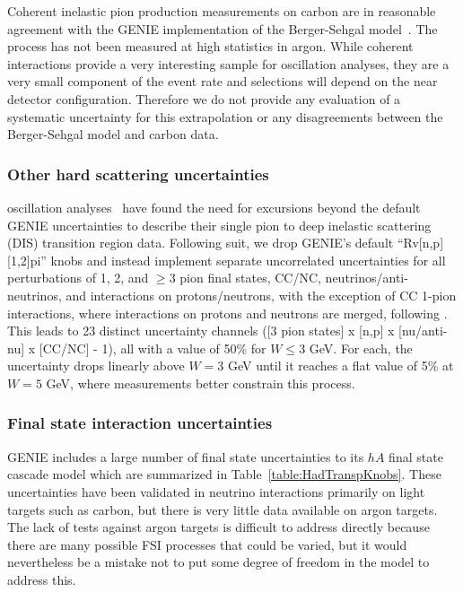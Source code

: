 Coherent inelastic pion production measurements on carbon are in reasonable agreement with the GENIE implementation of the Berger-Sehgal model~\cite{Mislivec:2017qfz}.  The process has not been measured at high statistics in argon. While coherent interactions provide a very interesting sample for oscillation analyses, they are a very small component of the event rate and selections will depend on the near detector configuration. Therefore we do not provide any evaluation of a systematic uncertainty for this extrapolation or any disagreements between the Berger-Sehgal model and carbon data.  

\subsubsection{Other hard scattering uncertainties}
\nova oscillation analyses~\cite{nova_2018} have found the need for excursions beyond the default GENIE uncertainties to describe their single pion to deep inelastic scattering (DIS) transition region data.  Following suit, we drop GENIE's default ``Rv[n,p][1,2]pi'' knobs and instead implement separate uncorrelated uncertainties for all perturbations of 1, 2, and $\geq 3$ pion final states, CC/NC, neutrinos/anti-neutrinos, and interactions on protons/neutrons, with the exception of CC 1-pion interactions, where interactions on protons and neutrons are merged, following \cite{Rodrigues:2016xjj}. This leads to 23 distinct uncertainty channels ([3 pion states] x [n,p] x [nu/anti-nu] x [CC/NC] - 1), all with a value of 50\% for $W \leq 3$ GeV.  For each, the uncertainty drops linearly above $W = 3$ GeV until it reaches a flat value of 5\% at $W = 5$ GeV, where measurements better constrain this process.

\subsubsection{Final state interaction uncertainties}\label{sec:fsi}
GENIE includes a large number of final state uncertainties to its $hA$ final state cascade model which are summarized in Table~\ref{table:HadTranspKnobs}.  These uncertainties have been validated in neutrino interactions primarily on light targets such as carbon, but there is very little data available on argon targets.  
The lack of tests against argon targets is difficult to address directly because there are many possible FSI processes that could be varied, but it would nevertheless be a mistake not to put some degree of freedom in the model to address this.


